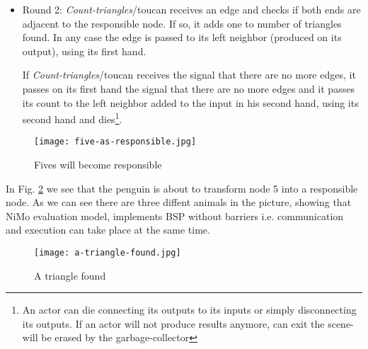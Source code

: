 \documentclass{article}                     \usepackage{graphics}
\begin{document}
\begin{itemize}
\begin{figure}[h]
	\centering
	\texttt{[image: start-counting-for-2.jpg]}
	\caption{Start to check edges for closing triangles}
	\label{stage2}
\end{figure}
\textit{Count-triangles}/toucan will keep the responsible node and all its adjacent ones collected by the corresponding  \textit{Collect-adjacent}/lion  actor and record that no triangles showed up so far as shown in Fig. \ref{stage2} having a third parameter set to . The actors  will have only two hands to shake with its neighbors: one hand to deal with the graph and the second hand to propagate the local triangle count.  

In figure Fig: \ref{stage2} we see the process \textit{Count-triangles}/toucan  prepared to count triangles that include the resposible node (2).

\item Round 2: \textit{Count-triangles}/toucan  receives an edge and checks  if  both ends are adjacent to the responsible node. If so, it adds one to number of triangles found. In any case the edge is passed to its left neighbor (produced on its output), using its first hand. 

If  \textit{Count-triangles}/toucan receives the signal that there are no more edges, it passes on its first hand the signal that there are no more edges and it passes its count to the left neighbor added to the input in his second hand, using its second hand and dies\footnote{An actor can die connecting its outputs to its inputs or simply  disconnecting  its outputs. If an actor will not produce results anymore, can exit the scene-will be erased by the garbage-collector}.
\end{itemize}

 \begin{figure}[h]
	\centering
	\texttt{[image: five-as-responsible.jpg]}
	\caption{Fives  will become responsible}
	\label{stage0.0}
\end{figure}

	In Fig. \ref{stage0.0} we see that the penguin is about to transform node  5 into a responsible node. As we can see there are three diffent animals in the picture, showing that NiMo evaluation model, implements BSP without barriers i.e. communication and execution can take place at the same time.
	
	
\begin{figure}[h]
	\centering
	\texttt{[image: a-triangle-found.jpg]}
	\caption{A  triangle found}
	\label{stage2.1}
\end{figure}
\end{document}

